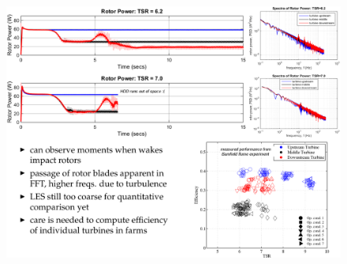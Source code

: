 \documentclass[xcolor=x11names,compress]{beamer}
\renewcommand{\(}{\begin{columns}}
\renewcommand{\)}{\end{columns}}
\newcommand{\<}[1]{\begin{column}{#1}}
\renewcommand{\>}{\end{column}}
\begin{document}
	\begin{frame}{}
		
		\vspace{-20pt}

		\begin{figure}[p]
		    \centering
		    \includegraphics[width=1.090\textwidth]{figures/Analysis_Slide.png}
		\end{figure}



		    


	\end{frame}

\end{document}
